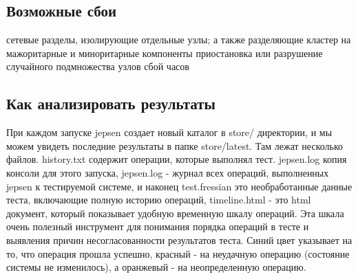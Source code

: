 \documentclass[12pt,  openany]{book}
\begin{document}
\subsection{Возможные сбои}
сетевые разделы, изолирующие отдельные узлы; а также разделяющие кластер на мажоритарные и миноритарные компоненты
приостановка или разрушение случайного подмножества узлов
сбой часов

\subsection{Как анализировать результаты}
При каждом запуске jepsen создает новый каталог в store/ директории, и мы можем увидеть последние результаты в папке store/latest. Там лежат несколько файлов. history.txt содержит операции, которые выполнял тест. jepsen.log копия консоли для этого запуска, jepsen.log - журнал всех операций, выполненных jepsen к тестируемой системе, и наконец test.fressian это необработанные данные теста, включающие полную историю операций, timeline.html - это html документ, который показывает удобную временную шкалу операций. Эта шкала очень полезный инструмент для понимания порядка операций в тесте и выявления причин несогласованности результатов теста.
Синий цвет указывает на то, что операция прошла успешно, красный - на неудачную операцию (состояние системы не изменилось), а оранжевый - на неопределенную операцию.
\end{document}
